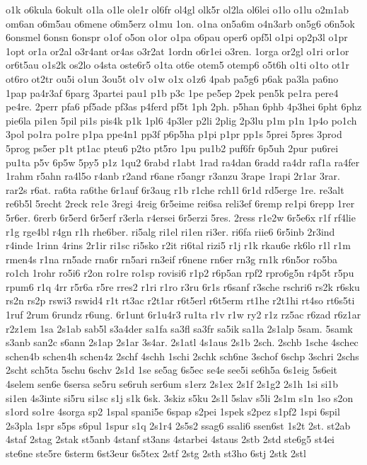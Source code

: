 {o1k
o6kula
6okult
o1la
o1le
ole1r
ol6fr
ol4gl
olk5r
ol2la
ol6lei
o1lo
o1lu
o2m1ab
om6an
o6m5au
o6mene
o6m5erz
o1mu
1on.
o1na
on5a6m
o4n3arb
on5g6
o6n5ok
6onsmel
6onsn
6onspr
o1of
o5on
o1or
o1pa
o6pau
oper6
opf5l
o1pi
op2p3l
o1pr
1opt
or1a
or2al
o3r4ant
or4as
o3r2at
1ordn
o6r1ei
o3ren.
1orga
or2gl
o1ri
or1or
or6t5au
o1s2k
os2lo
o4sta
oste6r5
o1ta
ot6e
otem5
otemp6
o5t6h
o1ti
o1to
ot1r
ot6ro
ot2tr
ou5i
o1un
3ou5t
o1v
o1w
o1x
o1z6
4pab
pa5g6
p6ak
pa3la
pa6no
1pap
pa4r3af
6parg
3partei
pau1
p1b
p3c
1pe
pe5ep
2pek
pen5k
pe1ra
pere4
pe4re.
2perr
pfa6
pf5ade
pf3as
p4ferd
pf5t
1ph
2ph.
p5han
6phb
4p3hei
6pht
6phz
pie6la
pi1en
5pil
pi1s
pis4k
p1k
1pl6
4p3ler
p2li
2plig
2p3lu
p1m
p1n
1p4o
po1ch
3pol
po1ra
po1re
p1pa
ppe4n1
pp3f
p6p5ha
p1pi
p1pr
pp1s
5prei
5pres
3prod
5prog
ps5er
p1t
pt1ac
pteu6
p2to
pt5ro
1pu
pu1b2
puf6fr
6p5uh
2pur
pu6rei
pu1ta
p5v
6p5w
5py5
p1z
1qu2
6rabd
r1abt
1rad
ra4dan
6radd
ra4dr
raf1a
ra4fer
1rahm
r5ahn
ra4l5o
r4anb
r2and
r6ane
r5angr
r3anzu
3rape
1rapi
2r1ar
3rar.
rar2s
r6at.
ra6ta
ra6the
6r1auf
6r3aug
r1b
r1che
rch1l
6r1d
rd5erge
1re.
re3alt
re6b5l
5recht
2reck
re1e
3regi
4reig
6r5eime
rei6sa
reli3ef
6remp
re1pi
6repp
1rer
5r6er.
6rerb
6r5erd
6r5erf
r3erla
r4ersei
6r5erzi
5res.
2ress
r1e2w
6r5e6x
r1f
rf4lie
r1g
rge4bl
r4gn
r1h
rhe6ber.
ri5alg
ri1el
ri1en
ri3er.
ri6fa
riie6
6r5inb
2r3ind
r4inde
1rinn
4rins
2r1ir
ri1sc
ri5sko
r2it
ri6tal
rizi5
r1j
r1k
rkau6e
rk6lo
r1l
r1m
rmen4s
r1na
rn5ade
rna6r
rn5ari
rn3eif
r6nene
rn6er
rn3g
rn1k
r6n5or
ro5ba
ro1ch
1rohr
ro5i6
r2on
ro1re
ro1sp
rovisi6
r1p2
r6p5an
rpf2
rpro6g5n
r4p5t
r5pu
rpum6
r1q
4rr
r5r6a
r5re
rres2
r1ri
r1ro
r3ru
6r1s
r6sanf
r3sche
rschri6
rs2k
r6sku
rs2n
rs2p
rswi3
rswid4
r1t
rt3ac
r2t1ar
r6t5erl
r6t5erm
rt1he
r2t1hi
rt4so
rt6s5ti
1ruf
2rum
6rundz
r6ung.
6r1unt
6r1u4r3
ru1ta
r1v
r1w
ry2
r1z
rz5ac
r6zad
r6z1ar
r2z1em
1sa
2s1ab
sab5l
s3a4der
sa1fa
sa3fl
sa3fr
sa5ik
sa1la
2s1alp
5sam.
5samk
s3anb
san2c
s6ann
2s1ap
2s1ar
3s4ar.
2s1atl
4s1aus
2s1b
2sch.
2schb
1sche
4schec
schen4b
schen4h
schen4z
2schf
4schh
1schi
2schk
sch6ne
3schof
6schp
3schri
2schs
2scht
sch5ta
5schu
6schv
2s1d
1se
se5ag
6s5ec
se4e
see5i
se6h5a
6s1eig
5s6eit
4selem
sen6e
6sersa
se5ru
se6ruh
ser6um
s1erz
2s1ex
2s1f
2s1g2
2s1h
1si
si1b
si1en
4s3inte
si5ru
si1sc
s1j
s1k
6sk.
3skiz
s5ku
2s1l
5slav
s5li
2s1m
s1n
1so
s2on
s1ord
so1re
4sorga
sp2
1spal
spani5e
6spap
s2pei
1spek
s2pez
s1pf2
1spi
6spil
2s3pla
1spr
s5ps
s6pul
1spur
s1q
2s1r4
2s5s2
ssag6
ssali6
ssen6st
1s2t
2st.
st2ab
4staf
2stag
2stak
st5anb
4stanf
st3ans
4starbei
4staus
2stb
2std
ste6g5
st4ei
ste6ne
ste5re
6sterm
6st3eur
6s5tex
2stf
2stg
2sth
st3ho
6stj
2stk
2stl
}

